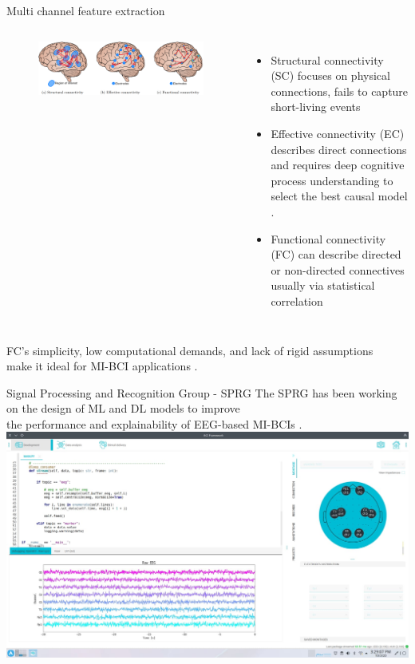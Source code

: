 \documentclass[aspectratio=169]{beamer}
\let\oldcite\cite %
\renewcommand{\cite}[1]{{\tiny\oldcite{#1}}}
\begin{document}
\begin{frame}{Multi channel feature extraction}
    \begin{columns}
            \begin{figure}[!ht]
                \centering
                \includegraphics[width=1\linewidth]{figures/connectivities.png}
            \end{figure}
            \begin{itemize}
                \item Structural connectivity (SC) focuses on physical connections, fails to capture short-living events \cite{thiebaut2020brain}
                \item Effective connectivity (EC) describes direct connections and requires deep cognitive process understanding to select the best causal model \cite{chiarion2023connectivity}.
                \item Functional connectivity (FC) can describe directed or non-directed connectives usually via statistical correlation \cite{cao2022brain}
            \end{itemize}
    \end{columns}
    \vspace{3em}
    \centering
    FC's simplicity, low computational demands, and lack of rigid assumptions\\ make it ideal for MI-BCI applications \cite{he2019electrophysiological}.
\end{frame}

\begin{frame}{Signal Processing and Recognition Group - SPRG}
    \centering
    The SPRG has been working on the design of ML and DL models to improve\\ the performance and explainability of EEG-based MI-BCIs \cite{collazos2023posthoc}.
    \centering
    \includegraphics[width=0.7\linewidth]{figures/bcisoft.jpeg}
\end{frame}
\end{document}

